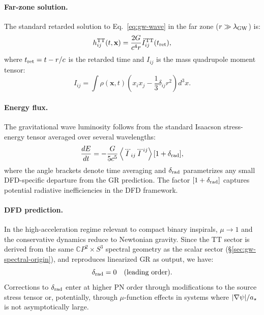 \paragraph{Far-zone solution.}
The standard retarded solution to Eq.~\eqref{eq:gw-wave} in the far zone ($r \gg \lambda_{\rm GW}$) is:
\begin{equation}\label{eq:gw-solution}
h_{ij}^{\rm TT}(t, \mathbf{x}) = \frac{2G}{c^4 r}\ddot{I}_{ij}^{\rm TT}(t_{\rm ret}),
\end{equation}
where $t_{\rm ret} = t - r/c$ is the retarded time and $I_{ij}$ is the mass quadrupole moment tensor:
\begin{equation}\label{eq:quadrupole-moment}
I_{ij} = \int \rho(\mathbf{x}, t)\left(x_i x_j - \frac{1}{3}\delta_{ij}r^2\right)d^3x.
\end{equation}

\paragraph{Energy flux.}
The gravitational wave luminosity follows from the standard Isaacson stress-energy tensor averaged over several wavelengths:
\begin{equation}\label{eq:gw-flux}
\frac{dE}{dt} = -\frac{G}{5c^5}\left\langle\dddot{I}_{ij}\dddot{I}^{ij}\right\rangle[1 + \delta_{\rm rad}],
\end{equation}
where the angle brackets denote time averaging and $\delta_{\rm rad}$ parametrizes any small DFD-specific departure from the GR prediction. The factor $[1 + \delta_{\rm rad}]$ captures potential radiative inefficiencies in the DFD framework.

\paragraph{DFD prediction.}
In the high-acceleration regime relevant to compact binary inspirals, $\mu \to 1$ and the conservative dynamics reduce to Newtonian gravity. Since the TT sector is derived from the same $\mathbb{C}P^2 \times S^3$ spectral geometry as the scalar sector (\S\ref{sec:gw-spectral-origin}), and reproduces linearized GR as output, we have:
\begin{equation}\label{eq:delta-rad-zero}
\delta_{\rm rad} = 0 \quad \text{(leading order)}.
\end{equation}
Corrections to $\delta_{\rm rad}$ enter at higher PN order through modifications to the source stress tensor or, potentially, through $\mu$-function effects in systems where $|\nabla\psi|/a_\star$ is not asymptotically large.

